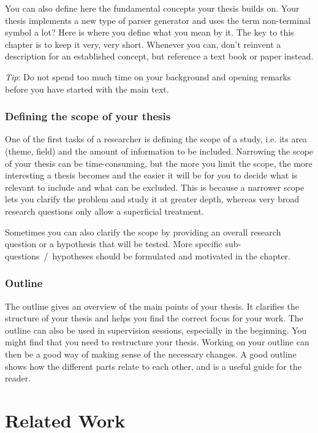\documentclass[a4paper,twoside]{bth}
\begin{document}
You can also define here the fundamental concepts your thesis builds on. Your thesis implements a new type of parser generator and uses the term non-terminal symbol a lot? Here is where you define what you mean by it. The key to this chapter is to keep it very, very short. Whenever you can, don't reinvent a description for an established concept, but reference a text book or paper instead.

\emph{Tip}: Do not spend too much time on your background and opening remarks before you have started with the main text.

\subsection{Defining the scope of your thesis}
One of the first tasks of a researcher is defining the scope of a study, i.e. its area (theme, field) and the amount of information to be included. Narrowing the scope of your thesis can be time-consuming, but the more you limit the scope, the more interesting a thesis becomes and the easier it will be for you to decide what is relevant to include and what can be excluded. This is because a narrower scope lets you clarify the problem and study it at greater depth, whereas very broad research questions only allow a superficial treatment.

Sometimes you can also clarify the scope by providing an overall research question or a hypothesis that will be tested. More specific sub-questions~/~hypotheses should be formulated and motivated in the  chapter.

\subsection{Outline}
The outline gives an overview of the main points of your thesis. It clarifies the structure of your thesis and helps you find the correct focus for your work. The outline can also be used in supervision sessions, especially in the beginning. You might find that you need to restructure your thesis. Working on your outline can then be a good way of making sense of the necessary changes. A good outline shows how the different parts relate to each other, and is a useful guide for the reader.

\chapter{Related Work}
\label{chp:relatedwork}
\end{document}
